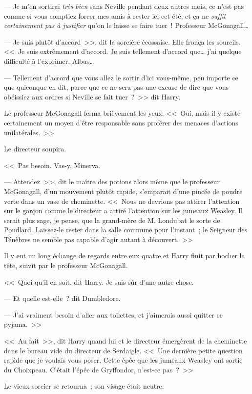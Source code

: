 --- Je m'en sortirai \emph{très bien} sans Neville pendant deux autres mois, ce n'est pas comme si vous comptiez forcer mes amis à rester ici cet été, et ça ne \emph{suffit certainement pas à justifier} qu'on le laisse se faire tuer~! Professeur McGonagall…

--- Je suis plutôt d'accord~>>, dit la sorcière écossaise. Elle fronça les sourcils. <<~Je suis extrêmement d'accord. Je suis tellement d'accord que… j'ai quelque difficulté à l'exprimer, Albus…

--- Tellement d'accord que vous allez le sortir d'ici vous-même, peu importe ce que quiconque en dit, parce que ce ne sera pas une excuse de dire que vous obéissiez aux ordres si Neville se fait tuer~?~>> dit Harry.

Le professeur McGonagall ferma brièvement les yeux. <<~Oui, mais il y existe certainement un moyen d'être responsable sans proférer des menaces d'actions unilatérales.~>>

Le directeur soupira.

<<~Pas besoin. Vas-y, Minerva.

--- Attendez~>>, dit le maître des potions alors même que le professeur McGonagall, d'un mouvement plutôt rapide, s'emparait d'une pincée de poudre verte dans un vase de cheminette. <<~Nous ne devrions pas attirer l'attention sur le garçon comme le directeur a attiré l'attention sur les jumeaux Weasley. Il serait plus sage, je pense, que la grand-mère de M. Londubat le sorte de Poudlard. Laissez-le rester dans la salle commune pour l'instant~; le Seigneur des Ténèbres ne semble pas capable d'agir autant à découvert.~>>

Il y eut un long échange de regards entre eux quatre et Harry finit par hocher la tête, suivit par le professeur McGonagall.

<<~Quoi qu'il en soit, dit Harry. Je suis sûr d'une autre chose.

--- Et quelle est-elle~? dit Dumbledore.

--- J'ai vraiment besoin d'aller aux toilettes, et j'aimerais aussi quitter ce pyjama.~>>

\later

<<~Au fait~>>, dit Harry quand lui et le directeur émergèrent de la cheminette dans le bureau vide du directeur de Serdaigle. <<~Une dernière petite question rapide que je voulais vous poser. Cette épée que les jumeaux Weasley ont sortie du Choixpeau. C'était l'épée de Gryffondor, n'est-ce pas~?~>>

Le vieux sorcier se retourna~; son visage était neutre.

